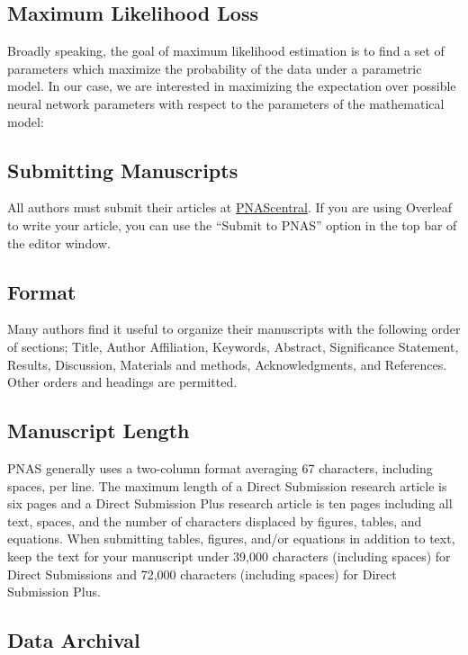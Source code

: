 \documentclass[9pt,twoside,lineno]{pnas-new}
\begin{document}
\subsection*{Maximum Likelihood Loss}
Broadly speaking, the goal of maximum likelihood estimation is to find a set of parameters which maximize the probability of the data under a parametric model. In our case, we are interested in maximizing the expectation over possible neural network parameters with respect to the parameters of the mathematical model:


\subsection*{Submitting Manuscripts}

All authors must submit their articles at \href{http://www.pnascentral.org/cgi-bin/main.plex}{PNAScentral}. If you are using Overleaf to write your article, you can use the ``Submit to PNAS'' option in the top bar of the editor window. 

\subsection*{Format}

Many authors find it useful to organize their manuscripts with the following order of sections;  Title, Author Affiliation, Keywords, Abstract, Significance Statement, Results, Discussion, Materials and methods, Acknowledgments, and References. Other orders and headings are permitted.

\subsection*{Manuscript Length}

PNAS generally uses a two-column format averaging 67 characters, including spaces, per line. The maximum length of a Direct Submission research article is six pages and a Direct Submission Plus research article is ten pages including all text, spaces, and the number of characters displaced by figures, tables, and equations.  When submitting tables, figures, and/or equations in addition to text, keep the text for your manuscript under 39,000 characters (including spaces) for Direct Submissions and 72,000 characters (including spaces) for Direct Submission Plus.


\subsection*{Data Archival}
\end{document}
